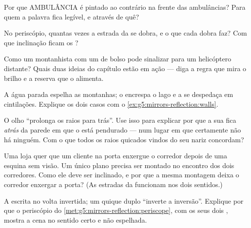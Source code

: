 \begin{exercise}[$\star$]\label{exo:g5:mirrors-reflection:5}
Por que AMBULÂNCIA é pintado ao contrário na frente das ambulâncias?
Para quem a palavra fica legível, e através de quê?
\end{exercise}

\begin{exercise}[$\star$]\label{exo:g5:mirrors-reflection:6}
No periscópio, quantas vezes a estrada da  se dobra, e o que cada
dobra faz? Com que inclinação ficam os ?
\end{exercise}

\begin{exercise}[$\star$]\label{exo:g5:mirrors-reflection:7}
Como um montanhista com um  de bolso pode sinalizar para um
helicóptero distante? Quais duas ideias do capítulo estão em ação ---
diga a regra que mira o brilho e a reserva que o alimenta.
\end{exercise}

\begin{exercise}[$\star$]\label{exo:g5:mirrors-reflection:8}
A água parada espelha as montanhas; o  encrespa o lago e a
 se despedaça em cintilações. Explique os dois casos com o
\cref{ex:g5:mirrors-reflection:walls}.
\end{exercise}

\begin{exercise}[$\star\star$]\label{exo:g5:mirrors-reflection:9}
O olho ``prolonga os raios para trás''. Use isso para explicar por
que a sua  fica \emph{atrás} da parede em que o  está
pendurado --- num lugar em que certamente não há ninguém. Com o que
todos os raios quicados vindos do seu nariz concordam?
\end{exercise}

\begin{exercise}[$\star\star$]\label{exo:g5:mirrors-reflection:10}
Uma loja quer que um cliente na porta enxergue o corredor depois de
uma esquina sem visão. Um único  plano precisa ser montado no
encontro dos dois corredores. Como ele deve ser inclinado, e por que
a mesma montagem deixa o corredor enxergar a porta? (As estradas da
 funcionam nos dois sentidos.)
\end{exercise}

\begin{exercise}[$\star\star$]\label{exo:g5:mirrors-reflection:11}
A escrita no  volta invertida; um quique duplo ``inverte a
inversão''. Explique por que o periscópio do
\cref{met:g5:mirrors-reflection:periscope}, com os seus dois
, mostra a cena no sentido certo e não espelhada.
\end{exercise}
